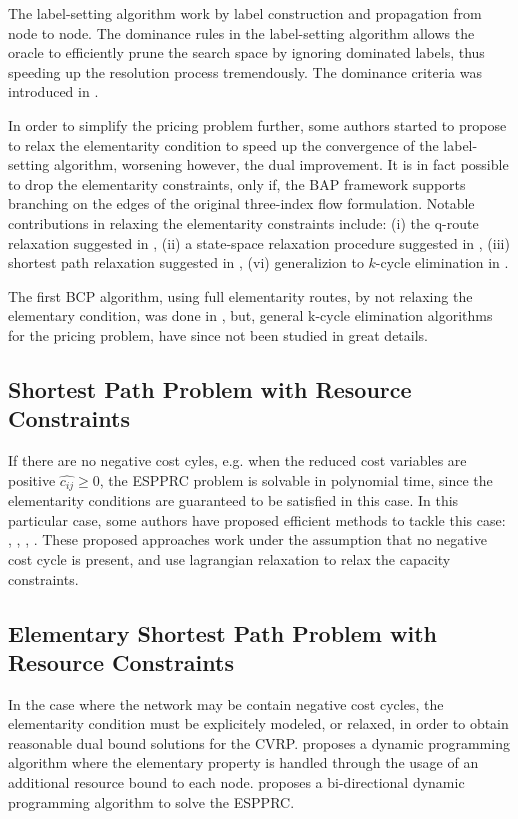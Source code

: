 
The label-setting algorithm work by label construction and propagation from node to node.
The dominance rules in the label-setting algorithm allows the oracle
to efficiently prune the search space by ignoring dominated labels, thus speeding
up the resolution process tremendously.
The dominance criteria was introduced in \cite{feillet2004}.

In order to simplify the pricing problem further,
some authors started to propose to relax the elementarity condition
to speed up the convergence of the label-setting algorithm, worsening however, the dual improvement.
It is in fact possible to drop the elementarity constraints, only if, the BAP framework supports
branching on the edges of the original three-index flow formulation.
Notable contributions in relaxing the elementarity constraints include:
(i) the q-route relaxation suggested in \textcite{christofides1981},
(ii) a state-space relaxation procedure suggested in \textcite{christofides1981a},
(iii) shortest path relaxation suggested in \textcite{desrosiers1984},
(vi) generalizion to $k$-cycle elimination in \textcite{irnich2006}.

The first BCP algorithm, using full elementarity routes, by not relaxing the elementary
condition, was done in \cite{chabrier2006},
but, general k-cycle elimination algorithms for the pricing problem, have since not been studied
in great details.

\subsection{Shortest Path Problem with Resource Constraints}
If there are no negative cost cyles, e.g. when the reduced cost variables are positive $\hat{c_{ij}} \ge 0$,
the ESPPRC problem is solvable in polynomial time, since the elementarity conditions are guaranteed
to be satisfied in this case.
In this particular case, some authors have proposed efficient methods to tackle this case:
\cite{beasley1989}, \cite{carlyle2008}, \cite{dumitrescu2003}, \cite{muhandiramge2009}.
These proposed approaches work under the assumption that no negative cost cycle is present,
and use lagrangian relaxation to relax the capacity constraints.


\subsection{Elementary Shortest Path Problem with Resource Constraints}
In the case where the network may be contain negative cost cycles, the
elementarity condition must be explicitely modeled, or relaxed, in order
to obtain reasonable dual bound solutions for the CVRP.
\textcite{feillet2004} proposes a dynamic programming algorithm where
the elementary property is handled through the usage of an additional resource
bound to each node.
\textcite{righini2006} proposes a bi-directional dynamic programming algorithm to solve the ESPPRC.



